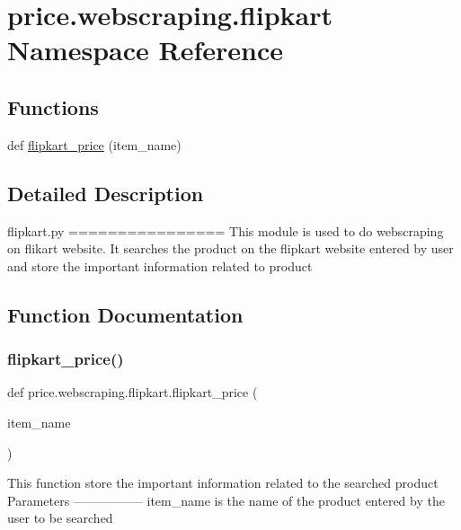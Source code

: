 \hypertarget{namespaceprice_1_1webscraping_1_1flipkart}{}\section{price.\+webscraping.\+flipkart Namespace Reference}
\label{namespaceprice_1_1webscraping_1_1flipkart}
\subsection*{Functions}
\begin{DoxyCompactItemize}
\item 
def \hyperlink{namespaceprice_1_1webscraping_1_1flipkart_a064a49025843d521d9f433bb435ba825}{flipkart\+\_\+price} (item\+\_\+name)
\end{DoxyCompactItemize}


\subsection{Detailed Description}
\begin{DoxyVerb}flipkart.py
================
This module is used to do webscraping on flikart website. It searches the product on the flipkart website entered by user and store the important information related to product
\end{DoxyVerb}
 

\subsection{Function Documentation}
\mbox{\label{namespaceprice_1_1webscraping_1_1flipkart_a064a49025843d521d9f433bb435ba825}} 
\subsubsection{\texorpdfstring{flipkart\+\_\+price()}{flipkart\_price()}}
{\footnotesize\ttfamily def price.\+webscraping.\+flipkart.\+flipkart\+\_\+price (\begin{DoxyParamCaption}\item[{}]{item\+\_\+name }\end{DoxyParamCaption})}

\begin{DoxyVerb}This function store the important information related to the searched product
Parameters
-----------------
item_name is the name of the product entered by the user to be searched
\end{DoxyVerb}
 